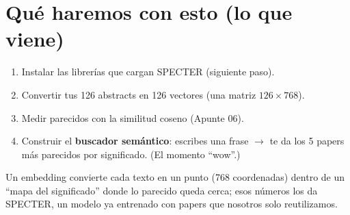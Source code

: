 \documentclass[11pt,a4paper]{article}
\begin{document}
\section{Qué haremos con esto (lo que viene)}

\begin{enumerate}
  \item Instalar las librerías que cargan SPECTER (siguiente paso).
  \item Convertir tus 126 abstracts en 126 vectores (una matriz $126 \times 768$).
  \item Medir parecidos con la similitud coseno (Apunte 06).
  \item Construir el \textbf{buscador semántico}: escribes una frase $\rightarrow$ te da los
        5 papers más parecidos por significado. (El momento ``wow''.)
\end{enumerate}

\begin{resumen}
Un embedding convierte cada texto en un punto (768 coordenadas) dentro de un ``mapa del
significado'' donde lo parecido queda cerca; esos números los da SPECTER, un modelo ya
entrenado con papers que nosotros solo reutilizamos.
\end{resumen}
\end{document}
